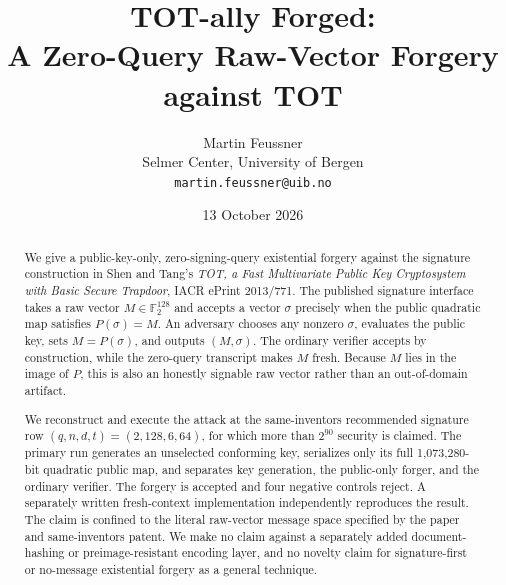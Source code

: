 \documentclass[10pt,a4paper]{article}
\title{\bfseries TOT-ally Forged:\\A Zero-Query Raw-Vector Forgery against TOT}
\author{Martin Feussner\\
\small Selmer Center, University of Bergen\\
\small \texttt{martin.feussner@uib.no}}
\date{13 October 2026}
\newcommand{\F}{\mathbb F}
\begin{document}
\maketitle

\noindent{}

\begin{abstract}
We give a public-key-only, zero-signing-query existential forgery against the
signature construction in Shen and Tang's \emph{TOT, a Fast Multivariate
Public Key Cryptosystem with Basic Secure Trapdoor}, IACR ePrint 2013/771.
The published signature interface takes a raw vector $M\in\F_2^{128}$ and
accepts a vector $\sigma$ precisely when the public quadratic map satisfies
$P(\sigma)=M$.  An adversary chooses any nonzero $\sigma$, evaluates the
public key, sets $M=P(\sigma)$, and outputs $(M,\sigma)$.  The ordinary
verifier accepts by construction, while the zero-query transcript makes $M$
fresh.  Because $M$ lies in the image of $P$, this is also an honestly
signable raw vector rather than an out-of-domain artifact.

We reconstruct and execute the attack at the same-inventors recommended
signature row $(q,n,d,t)=(2,128,6,64)$, for which more than $2^{90}$ security
is claimed.  The primary run generates an unselected conforming key,
serializes only its full 1,073,280-bit quadratic public map, and separates
key generation, the public-only forger, and the ordinary verifier.  The
forgery is accepted and four negative controls reject.  A separately written
fresh-context implementation independently reproduces the result.  The
claim is confined to the literal raw-vector message space specified by the
paper and same-inventors patent.  We make no claim against a separately added
document-hashing or preimage-resistant encoding layer, and no novelty claim
for signature-first or no-message existential forgery as a general technique.
\end{abstract}
\end{document}
